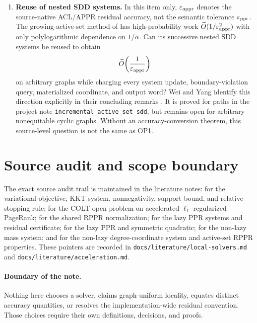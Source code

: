 \documentclass[11pt]{article}
\begin{document}
\begin{enumerate}[label=\textbf{OP\arabic*.},leftmargin=*]
\item \textbf{Reuse of nested SDD systems.}
In this item only, $\varepsilon_{\mathrm{appr}}$ denotes the source-native ACL/APPR residual
accuracy, not the semantic tolerance $\varepsilon_{\mathrm{ppr}}$.  The growing-active-set method
of \citet[Theorem~1.2]{wei2026simple} has high-probability work
$\widetilde O(1/\varepsilon_{\mathrm{appr}}^2)$ with only polylogarithmic dependence on
$1/\alpha$.  Can its successive nested SDD systems be reused to obtain
\begin{equation}
    \widetilde O\!\left(\frac{1}{\varepsilon_{\mathrm{appr}}}\right)
    \label{eq:problem-definitions-open-nested-sdd-work}
\end{equation}
on arbitrary graphs while charging every system update, boundary-violation
query, materialized coordinate, and output word?  Wei and Yang identify this
direction explicitly in their concluding remarks
\citep[PDF p.~15]{wei2026simple}.  It is proved for paths in the project note
\texttt{incremental\_active\_set\_sdd}, but remains open for arbitrary
nonequitable cyclic graphs.  Without an accuracy-conversion theorem, this
source-level question is not the same as OP1.
\end{enumerate}

\section{Source audit and scope boundary}
\label{sec:problem-definitions-source-boundary}

The exact source audit trail is maintained in the literature notes:
\citet[PDF pp.~8--18]{fountoulakis2019variational} for the variational
objective, KKT system, nonnegativity, support bound, and relative stopping
rule; \citet[PDF pp.~1--3]{fountoulakis2022open} for the COLT open problem on
accelerated $\ell_1$-regularized PageRank;
\citet[PDF p.~3, Section~3]{fountoulakis2026complexity} for the shared RPPR
normalization; \citet[PDF pp.~1--3 and supplemental PDF
p.~17]{zhou2024iterative} for the lazy PPR systems and residual certificate;
\citet[PDF pp.~1--3]{huang2025accelerated} for the lazy PPR and symmetric
quadratic; \citet[PDF p.~3]{chen2023accelerating} for the non-lazy mass
system; and \citet[PDF pp.~2--4 and 8--10]{wei2026simple} for the non-lazy
degree-coordinate system and active-set RPPR properties. These pointers are
recorded in
\texttt{docs/literature/local-solvers.md} and
\texttt{docs/literature/acceleration.md}.

\paragraph{Boundary of the note.}
Nothing here chooses a solver, claims graph-uniform locality, equates distinct
accuracy quantities, or resolves the implementation-wide residual convention.
Those choices require their own definitions, decisions, and proofs.



\end{document}
